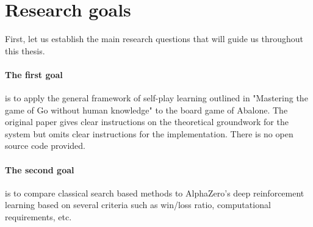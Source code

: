 \section{Research goals}
First, let us establish the main research questions that will guide us throughout this thesis.

\paragraph{The first goal} is to apply the general framework of self-play learning outlined in "Mastering the game of Go without human knowledge" to the board game of Abalone. \cite{silver_mastering_2017} The original paper gives clear instructions on the theoretical groundwork for the system but omits clear instructions for the implementation. There is no open source code provided.

\paragraph{The second goal} is to compare classical search based methods to AlphaZero's deep reinforcement learning based on several criteria such as win/loss ratio, computational requirements, etc.
